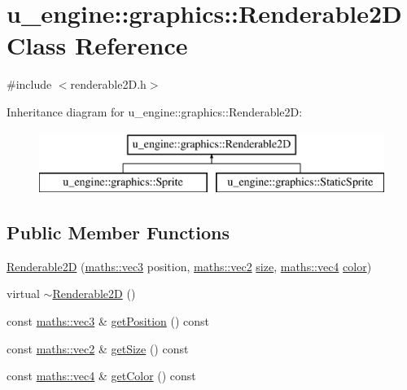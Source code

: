 \hypertarget{classu__engine_1_1graphics_1_1_renderable2_d}{}\section{u\+\_\+engine\+:\+:graphics\+:\+:Renderable2\+D Class Reference}
\label{classu__engine_1_1graphics_1_1_renderable2_d}


{\ttfamily \#include $<$renderable2\+D.\+h$>$}

Inheritance diagram for u\+\_\+engine\+:\+:graphics\+:\+:Renderable2\+D\+:\begin{figure}[H]
\begin{center}
\leavevmode
\includegraphics[height=2.000000cm]{classu__engine_1_1graphics_1_1_renderable2_d}
\end{center}
\end{figure}
\subsection*{Public Member Functions}
\begin{DoxyCompactItemize}
\item 
\hyperlink{classu__engine_1_1graphics_1_1_renderable2_d_acdc7a84857290506f345d357ac51fe37}{Renderable2\+D} (\hyperlink{structu__engine_1_1maths_1_1vec3}{maths\+::vec3} position, \hyperlink{structu__engine_1_1maths_1_1vec2}{maths\+::vec2} \hyperlink{glew_8h_a3d1e3edfcf61ca2d831883e1afbad89e}{size}, \hyperlink{structu__engine_1_1maths_1_1vec4}{maths\+::vec4} \hyperlink{glew_8h_a3ea846f998d64f079b86052b6c4193a8}{color})
\item 
virtual \hyperlink{classu__engine_1_1graphics_1_1_renderable2_d_a43d2ee8d12d8fb224f7b86b9d8ab8289}{$\sim$\+Renderable2\+D} ()
\item 
const \hyperlink{structu__engine_1_1maths_1_1vec3}{maths\+::vec3} \& \hyperlink{classu__engine_1_1graphics_1_1_renderable2_d_a0effc31dccfd2aa05bcae8c9ef46fa3e}{get\+Position} () const 
\item 
const \hyperlink{structu__engine_1_1maths_1_1vec2}{maths\+::vec2} \& \hyperlink{classu__engine_1_1graphics_1_1_renderable2_d_a7656d5848c3a8b8dd620e9381071edeb}{get\+Size} () const 
\item 
const \hyperlink{structu__engine_1_1maths_1_1vec4}{maths\+::vec4} \& \hyperlink{classu__engine_1_1graphics_1_1_renderable2_d_af1e0f83a39dab53ca99d3c2fb054065e}{get\+Color} () const 
\end{DoxyCompactItemize}
